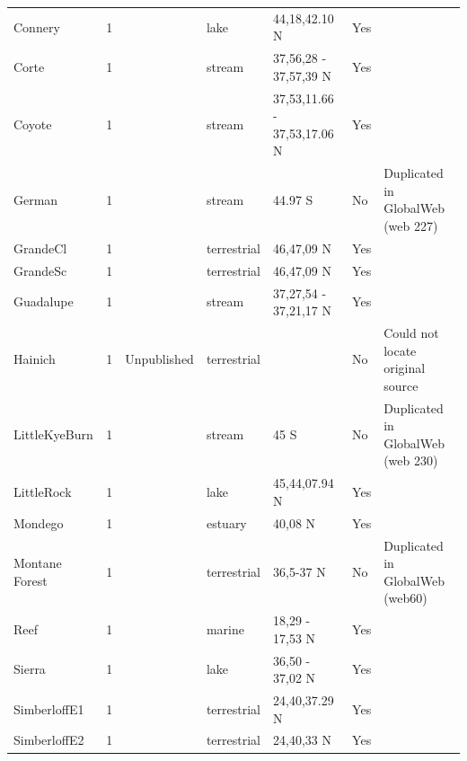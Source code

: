 \documentclass[12pt]{article}
\begin{document}
\begin{landscape}
\begin{table}[h!]
{\begin{tabular}{p{2.8cm}p{1.3cm}p{3cm}p{2.2cm}p{2.5cm}lp{8.2cm}}
        Connery & 1 & \cite{Havens1992}    & lake  & 44,18,42.10 N & Yes   &       \\
        Corte & 1 & \cite{Harrison1995}    & stream & 37,56,28 - 37,57,39 N & Yes   &       \\
        Coyote & 1 & \cite{Harrison1995}    & stream & 37,53,11.66 - 37,53,17.06 N & Yes   &       \\
        German & 1 & \cite{Townsend1998}  & stream & 44.97 S & No    & Duplicated in GlobalWeb (web 227) \\
        GrandeCl & 1 & \cite{CattinBlandenier2004} & terrestrial & 46,47,09 N & Yes   &       \\
        GrandeSc & 1 & \cite{CattinBlandenier2004} & terrestrial & 46,47,09 N & Yes   &       \\
        Guadalupe & 1 & \cite{Harrison1995}    & stream & 37,27,54 - 37,21,17 N & Yes   &       \\
        Hainich   & 1 & Unpublished  & terrestrial &       & No    & Could not locate original source \\
        LittleKyeBurn & 1 & \cite{Townsend1998}  & stream & 45 S  & No    & Duplicated in GlobalWeb (web 230) \\
        LittleRock & 1 & \cite{Martinez1991}    & lake  & 45,44,07.94 N & Yes   &       \\
        Mondego & 1 & \cite{Patricio2006}  & estuary & 40,08 N & Yes   &       \\
        Montane Forest & 1 & \cite{Rasmussen1941}    & terrestrial & 36,5-37 N & No    & Duplicated in GlobalWeb (web60) \\
        Reef  & 1 & \cite{Opitz1996}  & marine & 18,29 - 17,53 N & Yes   &       \\
        Sierra & 1 & \cite{Brose2005}    & lake  & 36,50 - 37,02 N & Yes   &       \\
        SimberloffE1 & 1 & \cite{Simberloff1976}  & terrestrial & 24,40,37.29 N & Yes   &       \\
        SimberloffE2 & 1 & \cite{Simberloff1976}  & terrestrial & 24,40,33 N & Yes   &       \\
        \hline
      \end{tabular}}%
      \end{table}

        \newpage


\end{landscape}
\end{document}
